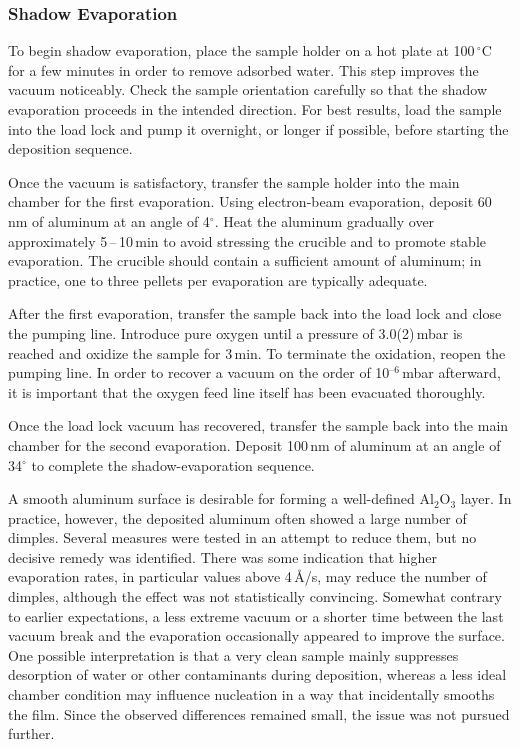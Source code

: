     \subsubsection*{Shadow Evaporation}
        To begin shadow evaporation, place the sample holder on a hot plate at 100\,$^\circ$C for a few minutes in order to remove adsorbed water. This step improves the vacuum noticeably. Check the sample orientation carefully so that the shadow evaporation proceeds in the intended direction. For best results, load the sample into the load lock and pump it overnight, or longer if possible, before starting the deposition sequence.

        Once the vacuum is satisfactory, transfer the sample holder into the main chamber for the first evaporation. Using electron-beam evaporation, deposit 60\,nm of aluminum at an angle of 4$^\circ$. Heat the aluminum gradually over approximately 5\,--\,10\,min to avoid stressing the crucible and to promote stable evaporation. The crucible should contain a sufficient amount of aluminum; in practice, one to three pellets per evaporation are typically adequate.

        After the first evaporation, transfer the sample back into the load lock and close the pumping line. Introduce pure oxygen until a pressure of 3.0(2)\,mbar is reached and oxidize the sample for 3\,min. To terminate the oxidation, reopen the pumping line. In order to recover a vacuum on the order of 10$^\text{--6}$\,mbar afterward, it is important that the oxygen feed line itself has been evacuated thoroughly.

        Once the load lock vacuum has recovered, transfer the sample back into the main chamber for the second evaporation. Deposit 100\,nm of aluminum at an angle of 34$^\circ$ to complete the shadow-evaporation sequence.

        A smooth aluminum surface is desirable for forming a well-defined Al$_\text{2}$O$_\text{3}$ layer. In practice, however, the deposited aluminum often showed a large number of dimples. Several measures were tested in an attempt to reduce them, but no decisive remedy was identified. There was some indication that higher evaporation rates, in particular values above 4\,\AA/s, may reduce the number of dimples, although the effect was not statistically convincing. Somewhat contrary to earlier expectations, a less extreme vacuum or a shorter time between the last vacuum break and the evaporation occasionally appeared to improve the surface. One possible interpretation is that a very clean sample mainly suppresses desorption of water or other contaminants during deposition, whereas a less ideal chamber condition may influence nucleation in a way that incidentally smooths the film. Since the observed differences remained small, the issue was not pursued further.


